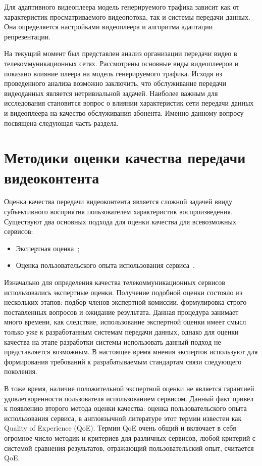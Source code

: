 Для адаптивного видеоплеера модель генерируемого трафика зависит как от характеристик просматриваемого видеопотока, так и системы передачи данных. Она определяется настройками видеоплеера и алгоритма адаптации репрезентации.

На текущий момент был представлен анализ организации передачи видео в телекоммуникационных сетях. Рассмотрены основные виды видеоплееров и показано влияние плеера на модель генерируемого трафика. Исходя из проведенного анализа возможно заключить, что обслуживание передачи видеоданных является нетривиальной задачей. Наиболее важным для исследования становится вопрос о влиянии характеристик сети передачи данных и видеоплеера на качество обслуживания абонента. Именно данному вопросу посвящена следующая часть раздела.

\section{Методики оценки качества передачи видеоконтента}
\label{chap1:VideoMOS}

Оценка качества передачи видеоконтента является сложной задачей ввиду субъективного восприятия пользователем характеристик воспроизведения. Существуют два основных подхода для оценки качества для всевозможных сервисов:
\begin{itemize}
  \item Экспертная оценка~\cite{Experts};
  \item Оценка пользовательского опыта использования сервиса~\cite{QoE}.
\end{itemize}

Изначально для определения качества телекоммуникационных сервисов использовались экспертные оценки. Получение подобной оценки состояло из нескольких этапов: подбор членов экспертной комиссии, формулировка строго поставленных вопросов и ожидание результата. Данная процедура занимает много времени, как следствие, использование экспертной оценки имеет смысл только уже к разработанным системам передачи данных, однако для оценки качества на этапе разработки системы использовать данный подход не представляется возможным. В настоящее время мнения экспертов используют для формирования требований к разрабатываемым стандартам связи следующего поколения.

В тоже время, наличие положительной экспертной оценки не является гарантией удовлетворенности пользователя использованием сервисом. Данный факт привел к появлению второго метода оценки качества: оценка пользовательского опыта использования сервиса, в англоязычной литературе этот термин известен как Quality of Experience (QoE). Термин QoE очень общий и включает в себя огромное число методик и критериев для различных сервисов, любой критерий с системой сравнения результатов, отражающий пользовательский опыт, считается QoE.

